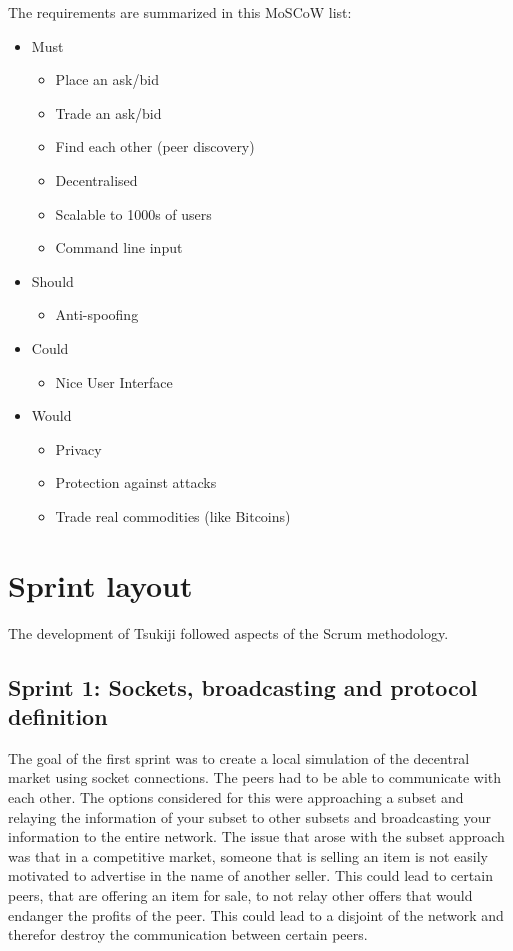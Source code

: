 \documentclass[]{article}
\newenvironment{myitemize}
{ \begin{itemize}
    \setlength{\itemsep}{0pt}
    \setlength{\parskip}{0pt}
    \setlength{\parsep}{0pt}     }
{ \end{itemize}                  }
\begin{document}
The requirements are summarized in this MoSCoW list: \\

\begin{myitemize}
\item Must
\begin{myitemize}
	\item Place an ask/bid
	\item Trade an ask/bid
    \item Find each other (peer discovery)
    \item Decentralised
    \item Scalable to 1000s of users
    \item Command line input
\end{myitemize}
\item Should
\begin{myitemize}
	\item Anti-spoofing
\end{myitemize}
\item Could
\begin{myitemize}
	\item Nice User Interface
\end{myitemize}
\item Would
\begin{myitemize}
	\item Privacy
	\item Protection against attacks
	\item Trade real commodities (like Bitcoins)
\end{myitemize}
\end{myitemize}

\section{Sprint layout}
The development of Tsukiji followed aspects of the Scrum methodology.

\subsection{Sprint 1: Sockets, broadcasting and protocol definition}
The goal of the first sprint was to create a local simulation of the decentral market using socket connections.
The peers had to be able to communicate with each other.
The options considered for this were approaching a subset and relaying the information of your subset to other subsets and broadcasting your information to the entire network.
The issue that arose with the subset approach was that in a competitive market, someone that is selling an item is not easily motivated to advertise in the name of another seller.
This could lead to certain peers, that are offering an item for sale, to not relay other offers that would endanger the profits of the peer.
This could lead to a disjoint of the network and therefor destroy the communication between certain peers.
\end{document}
